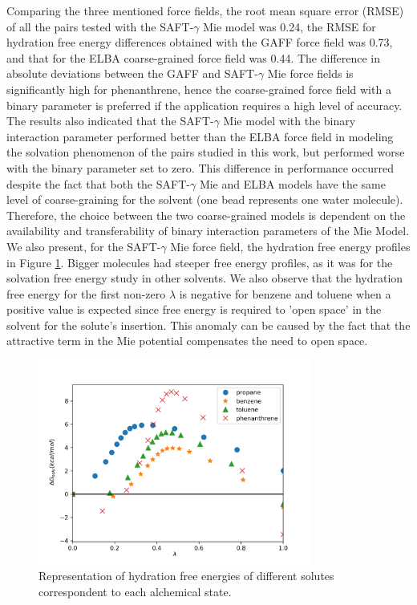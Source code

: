 Comparing the three mentioned force fields, the root mean square error (RMSE) of all the pairs tested with the SAFT-$\gamma$ Mie model was  0.24, the RMSE for hydration free energy differences obtained with the GAFF force field was 0.73, and that for the ELBA coarse-grained force field was 0.44. The difference in absolute deviations between the GAFF and SAFT-$\gamma$ Mie force fields is significantly high for phenanthrene, hence the coarse-grained force field with a binary parameter is preferred if the application requires a high level of accuracy. The results also indicated that the SAFT-$\gamma$ Mie model with the binary interaction parameter performed better than the ELBA force field in modeling the solvation phenomenon of the pairs studied in this work, but performed worse with the binary parameter set to zero. This difference in performance occurred despite the fact that both the SAFT-$\gamma$ Mie and ELBA models have the same level of coarse-graining for the solvent (one bead represents one water molecule). Therefore, the choice between the two coarse-grained models is dependent on the availability and transferability of binary interaction parameters of the Mie Model. We also present, for the SAFT-$\gamma$ Mie force field, the hydration free energy profiles in Figure \ref{fig:water}. Bigger molecules had steeper free energy profiles, as it was for the solvation free energy study in other solvents. We also observe that the hydration free energy for the first non-zero $\lambda$ is negative for benzene and toluene when a positive value is expected since free energy is required to 'open space' in the solvent for the solute's insertion. This anomaly can be caused by the fact that the attractive term in the Mie potential compensates the need to open space. 

\begin{figure}[H]
	\centering
	\includegraphics[width=0.8\textwidth]{Figures/water}
	\caption{Representation of hydration free energies of different solutes correspondent to each alchemical state.}
	\label{fig:water}
\end{figure}

